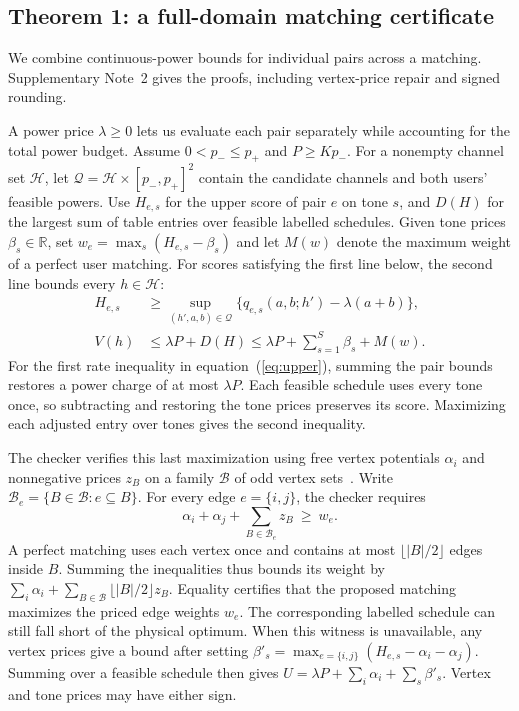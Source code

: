 \subsection*{Theorem 1: a full-domain matching certificate}
We combine continuous-power bounds for individual pairs across a matching. Supplementary Note~2 gives the proofs, including vertex-price repair and signed rounding.

A power price \(\lambda\geq0\) lets us evaluate each pair separately while accounting for the total power budget. Assume \(0<p_-\leq p_+\) and \(P\geq Kp_-\). For a nonempty channel set \(\mathcal H\), let \(\mathcal Q=\mathcal H\times[p_-,p_+]^2\) contain the candidate channels and both users' feasible powers. Use \(H_{e,s}\) for the upper score of pair \(e\) on tone \(s\), and \(D(H)\) for the largest sum of table entries over feasible labelled schedules. Given tone prices \(\beta_s\in\mathbb R\), set \(w_e=\max_s(H_{e,s}-\beta_s)\) and let \(M(w)\) denote the maximum weight of a perfect user matching. For scores satisfying the first line below, the second line bounds every \(h\in\mathcal H\):
\begin{equation}
\begin{aligned}
 H_{e,s} &\geq \sup_{(h',a,b)\in\mathcal Q}
       \bigl\{q_{e,s}(a,b;h')-\lambda(a+b)\bigr\},\\[2pt]
 V(h)&\leq\lambda P+D(H)\leq\lambda P+\sum_{s=1}^{S}\beta_s+M(w).
\end{aligned}
\label{eq:upper}
\end{equation}
For the first rate inequality in equation~(\ref{eq:upper}), summing the pair bounds restores a power charge of at most \(\lambda P\). Each feasible schedule uses every tone once, so subtracting and restoring the tone prices preserves its score. Maximizing each adjusted entry over tones gives the second inequality.

The checker verifies this last maximization using free vertex potentials \(\alpha_i\) and nonnegative prices \(z_B\) on a family \(\mathcal B\) of odd vertex sets~\cite{edmonds}. Write \(\mathcal B_e=\{B\in\mathcal B:e\subseteq B\}\). For every edge \(e=\{i,j\}\), the checker requires
\[
 \alpha_i+\alpha_j+\sum_{B\in\mathcal B_e}z_B\ \geq\ w_e .
\]
A perfect matching uses each vertex once and contains at most \(\lfloor |B|/2\rfloor\) edges inside \(B\). Summing the inequalities thus bounds its weight by \(\sum_i\alpha_i+\sum_{B\in\mathcal B}\lfloor |B|/2\rfloor z_B\). Equality certifies that the proposed matching maximizes the priced edge weights \(w_e\). The corresponding labelled schedule can still fall short of the physical optimum. When this witness is unavailable, any vertex prices give a bound after setting \(\beta'_s=\max_{e=\{i,j\}}(H_{e,s}-\alpha_i-\alpha_j)\). Summing over a feasible schedule then gives \(U=\lambda P+\sum_i\alpha_i+\sum_s\beta'_s\). Vertex and tone prices may have either sign.

